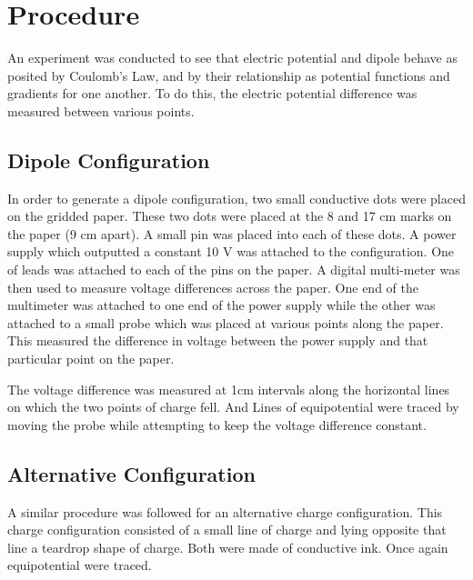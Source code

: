 \documentclass[11pt]{article}
\begin{document}
\section{Procedure}
An experiment was conducted to see that electric potential and dipole behave as posited by Coulomb's Law, and by their relationship as potential functions and gradients for one another. To do this, the electric potential difference was measured between various points. 
\subsection{Dipole Configuration}
In order to generate a dipole configuration, two small conductive dots were placed on the gridded paper. These two dots were placed at the 8 and 17 cm marks on the paper (9 cm apart). A small pin was placed into each of these dots. A power supply which outputted a constant 10 V was attached to the configuration. One of leads was attached to each of the pins on the paper. A digital multi-meter was then used to measure voltage differences across the paper. One end of the multimeter was attached to one end of the power supply while the other was attached to a small probe which was placed at various points along the paper. This measured the difference in voltage between the power supply and that particular point on the paper.

The voltage difference was measured at 1cm intervals along the horizontal lines on which the two points of charge fell. And Lines of equipotential were traced by moving the probe while attempting to keep the voltage difference constant.

\subsection{Alternative Configuration}
A similar procedure was followed for an alternative charge configuration. This charge configuration consisted of a small line of charge and lying opposite that line a teardrop shape of charge. Both were made of conductive ink. Once again equipotential were traced.
\end{document}
